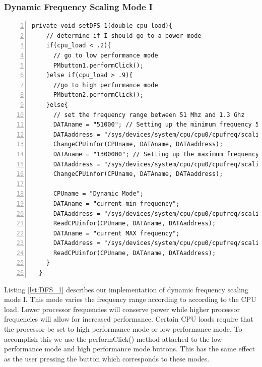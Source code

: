 \documentclass{article} %
\begin{document}
\subsubsection{Dynamic Frequency Scaling Mode I}
\begin{lstlisting}[float=*,caption={Dynamic Frequency Scaling Mode I},label={lst:DFS_1},numbers=left]
private void setDFS_1(double cpu_load){
    // determine if I should go to a power mode
    if(cpu_load < .2){
      // go to low performance mode
      PMbutton1.performClick();
    }else if(cpu_load > .9){
      //go to high performance mode
      PMbutton2.performClick();
    }else{
      // set the frequency range between 51 Mhz and 1.3 Ghz
      DATAname = "51000"; // Setting up the minimum frequency 51 Mhz
      DATAaddress = "/sys/devices/system/cpu/cpu0/cpufreq/scaling_min_freq";
      ChangeCPUinfor(CPUname, DATAname, DATAaddress);
      DATAname = "1300000"; // Setting up the maximum frequency at 1300 MHz
      DATAaddress = "/sys/devices/system/cpu/cpu0/cpufreq/scaling_max_freq";
      ChangeCPUinfor(CPUname, DATAname, DATAaddress);

      CPUname = "Dynamic Mode";
      DATAname = "current min frequency";
      DATAaddress = "/sys/devices/system/cpu/cpu0/cpufreq/scaling_min_freq";
      ReadCPUinfor(CPUname, DATAname, DATAaddress);
      DATAname = "current MAX frequency";
      DATAaddress = "/sys/devices/system/cpu/cpu0/cpufreq/scaling_max_freq";
      ReadCPUinfor(CPUname, DATAname, DATAaddress);
    }
  }
\end{lstlisting}
Listing \ref{lst:DFS_1} describes our implementation of dynamic frequency scaling mode I. This mode varies the frequency range according to according to the CPU load. Lower processor frequencies will conserve power while higher processor frequencies will allow for increased performance. 
Certain CPU loads require that the processor be set to high performance mode or low performance mode. To accomplish this we use the performClick() method attached to the low performance mode and high performance mode buttons. This has the same effect as the user pressing the button which corresponds to these modes.
\end{document}
